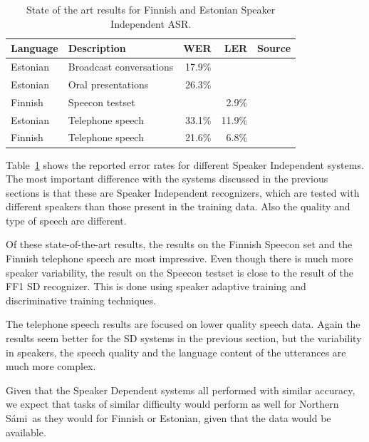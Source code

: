 \documentclass[b5paper]{article}
\newcommand{\todo}[2]{{\textcolor{red}{\bf [#1] #2 }}}
\newcommand{\ns}{Northern Sámi}
\begin{document}
\begin{table}
\centering
\begin{tabular}{llrrl}
\textbf{Language} & \textbf{Description} & \textbf{WER} & \textbf{LER} & \textbf{Source}\\\hline
Estonian & Broadcast conversations  & 17.9\% & &  \cite{alumae2014recent} \\
Estonian & Oral presentations  & 26.3\% & & \cite{alumae2014recent} \\
Finnish & Speecon testset  & & 2.9\%&  \cite{pylkkonen2012} \\
Estonian & Telephone speech &33.1\% & 11.9\% & \cite{hirsimaki2009importance}\\
Finnish & Telephone speech & 21.6\% & 6.8\% & \cite{hirsimaki2009importance}\\
\end{tabular}
\caption{State of the art results for Finnish and Estonian Speaker Independent ASR.}\label{tbl:stateoftheart}
\end{table}

Table~\ref{tbl:stateoftheart} shows the reported error rates for different Speaker Independent systems. The most important difference with the systems discussed in the previous sections is that these are Speaker Independent recognizers, which are tested with different speakers than those present in the training data. Also the quality and type of speech are different. 

Of these state-of-the-art results, the results on the Finnish Speecon set and the Finnish telephone speech are most impressive. Even though there is much more speaker variability, the result on the Speecon testset is close to the result of the FF1 SD recognizer. This is done using speaker adaptive training and discriminative training techniques. 

The telephone speech results are focused on lower quality speech data. Again the results seem better for the SD systems in the previous section, but the variability in speakers, the speech quality and the language content of the utterances are much more complex. 

Given that the Speaker Dependent systems all performed with similar accuracy, we expect that tasks of similar difficulty would perform as well for \ns\ as they would for Finnish or Estonian, given that the data would be available.

\end{document}
